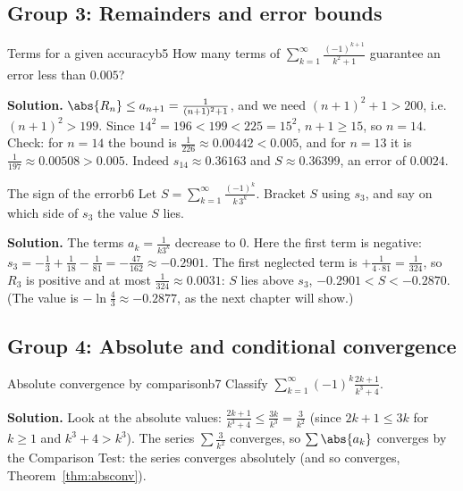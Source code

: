 \documentclass[11pt]{article}
\begin{document}
\subsection*{Group 3: Remainders and error bounds}

\begin{exmp}{Terms for a given accuracy}{b5}
How many terms of $\displaystyle\sum_{k=1}^\infty\frac{(-1)^{k+1}}{k^2+1}$ guarantee an error less than $0.005$?

\textbf{Solution.} $\abs{R_n}\le a_{n+1}=\frac1{(n+1)^2+1}$, and we need $(n+1)^2+1>200$, i.e. $(n+1)^2>199$. Since $14^2=196<199<225=15^2$, $n+1\ge15$, so $n=14$. Check: for $n=14$ the bound is $\frac1{226}\approx0.00442<0.005$, and for $n=13$ it is $\frac1{197}\approx0.00508>0.005$. Indeed $s_{14}\approx0.36163$ and $S\approx0.36399$, an error of $0.0024$.
\end{exmp}

\begin{exmp}{The sign of the error}{b6}
Let $S=\displaystyle\sum_{k=1}^\infty\frac{(-1)^k}{k\,3^k}$. Bracket $S$ using $s_3$, and say on which side of $s_3$ the value $S$ lies.

\textbf{Solution.} The terms $a_k=\frac1{k3^k}$ decrease to $0$. Here the first term is negative: $s_3=-\frac13+\frac1{18}-\frac1{81}=-\frac{47}{162}\approx-0.2901$. The first neglected term is $+\frac1{4\cdot81}=\frac1{324}$, so $R_3$ is positive and at most $\frac1{324}\approx0.0031$: $S$ lies above $s_3$, $-0.2901<S<-0.2870$. (The value is $-\ln\frac43\approx-0.2877$, as the next chapter will show.)
\end{exmp}

\subsection*{Group 4: Absolute and conditional convergence}

\begin{exmp}{Absolute convergence by comparison}{b7}
Classify $\displaystyle\sum_{k=1}^\infty(-1)^k\frac{2k+1}{k^3+4}$.

\textbf{Solution.} Look at the absolute values: $\frac{2k+1}{k^3+4}\le\frac{3k}{k^3}=\frac3{k^2}$ (since $2k+1\le3k$ for $k\ge1$ and $k^3+4>k^3$). The series $\sum\frac3{k^2}$ converges, so $\sum\abs{a_k}$ converges by the Comparison Test: the series converges absolutely (and so converges, Theorem~\ref{thm:absconv}).
\end{exmp}
\end{document}
